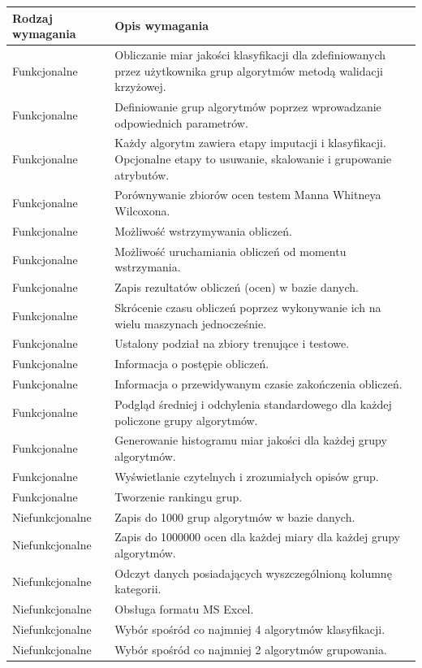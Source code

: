 \documentclass[../thesis.tex]{subfiles}
\begin{document}
\begin{table}[h]
\begin{center}
\begin{tabular}{ | l | p{110mm} | }
\hline
\rowcolor{lightgray} Rodzaj wymagania & Opis wymagania \\\hline

Funkcjonalne & Obliczanie miar jakości klasyfikacji dla zdefiniowanych przez użytkownika grup algorytmów metodą walidacji krzyżowej. \\\hline
Funkcjonalne & Definiowanie grup algorytmów poprzez wprowadzanie odpowiednich parametrów. \\\hline
Funkcjonalne & Każdy algorytm zawiera etapy imputacji i klasyfikacji. Opcjonalne etapy to usuwanie, skalowanie i grupowanie atrybutów. \\\hline
Funkcjonalne & Porównywanie zbiorów ocen testem Manna Whitneya Wilcoxona. \\\hline
Funkcjonalne & Możliwość wstrzymywania obliczeń. \\\hline
Funkcjonalne & Możliwość uruchamiania obliczeń od momentu wstrzymania. \\\hline
Funkcjonalne & Zapis rezultatów obliczeń (ocen) w bazie danych. \\\hline
Funkcjonalne & Skrócenie czasu obliczeń poprzez wykonywanie ich na wielu maszynach jednocześnie. \\\hline
Funkcjonalne & Ustalony podział na zbiory trenujące i testowe. \\\hline
Funkcjonalne & Informacja o postępie obliczeń. \\\hline
Funkcjonalne & Informacja o przewidywanym czasie zakończenia obliczeń. \\\hline
Funkcjonalne & Podgląd średniej i odchylenia standardowego dla każdej policzone grupy algorytmów. \\\hline
Funkcjonalne & Generowanie histogramu miar jakości dla każdej grupy algorytmów. \\\hline
Funkcjonalne & Wyświetlanie czytelnych i zrozumiałych opisów grup. \\\hline
Funkcjonalne & Tworzenie rankingu grup. \\\hline

Niefunkcjonalne & Zapis do 1000 grup algorytmów w bazie danych. \\\hline
Niefunkcjonalne & Zapis do 1000000 ocen dla każdej miary dla każdej grupy algorytmów. \\\hline
Niefunkcjonalne & Odczyt danych posiadających wyszczególnioną kolumnę kategorii. \\\hline 
Niefunkcjonalne & Obsługa formatu MS Excel. \\\hline
Niefunkcjonalne & Wybór spośród co najmniej 4 algorytmów klasyfikacji. \\\hline 
Niefunkcjonalne & Wybór spośród co najmniej 2 algorytmów grupowania.\\\hline


\end{tabular}
\end{center}
\end{table}
\end{document}
